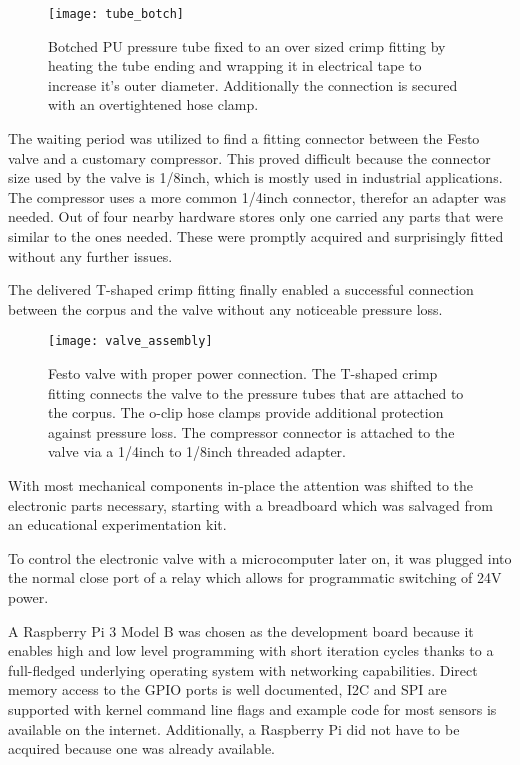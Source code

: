 \newpage

\begin{figure}[hp]
\centering

\texttt{[image: tube\_botch]}

\caption{Botched PU pressure tube fixed to an over sized crimp fitting by heating the tube ending and wrapping it in electrical tape to increase it's outer diameter. Additionally the connection is secured with an overtightened hose clamp.}
\end{figure}

The waiting period was utilized to find a fitting connector between the Festo valve and a customary compressor. This proved difficult because the connector size used by the valve is 1/8inch, which is mostly used in industrial applications. The compressor uses a more common 1/4inch connector, therefor an adapter was needed. Out of four nearby hardware stores only one carried any parts that were similar to the ones needed. These were promptly acquired and surprisingly fitted without any further issues.

The delivered T-shaped crimp fitting finally enabled a successful connection between the corpus and the valve without any noticeable pressure loss.  

\begin{figure}[hp]
\centering

\texttt{[image: valve\_assembly]}

\caption{Festo valve with proper power connection. The T-shaped crimp fitting connects the valve to the pressure tubes that are attached to the corpus. The o-clip hose clamps provide additional protection against pressure loss. The compressor connector is attached to the valve via a 1/4inch to 1/8inch threaded adapter.}
\end{figure}

\newpage

With most mechanical components in-place the attention was shifted to the electronic parts necessary, starting with a breadboard which was salvaged from an educational experimentation kit. 

To control the electronic valve with a microcomputer later on, it was plugged into the normal close port of a relay which allows for programmatic switching of 24V power. 

A Raspberry Pi 3 Model B \cite{raspberry-pi} was chosen as the development board because it enables high and low level programming with short iteration cycles thanks to a full-fledged underlying operating system \cite{raspbian} with networking capabilities. Direct memory access to the GPIO ports is well documented, I2C and SPI are supported with kernel command line flags and example code for most sensors is available on the internet. Additionally, a Raspberry Pi did not have to be acquired because one was already available.

